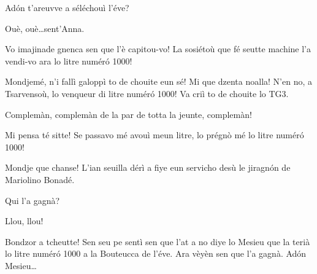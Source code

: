 \begin{drama}
\Prosperospeaks {} Ad\'on t'areuvve a séléchouì l'éve?

\Francoisspeaks Ouè, ouè\ldots sent'Anna.




\Valletspeaks Vo imajinade gnenca sen que l’è capitou-vo! La sosiétoù que fé seutte machine l’a vendi-vo ara lo litre numér\'o 1000!


\Seunteuccospeaks Mondjemé, n’i fallì galoppì to de chouite eun sé! Mi que dzenta noalla! N’en no, a Tsarvensoù, lo venqueur di litre numér\'o 1000!  Va criì to de chouite lo TG3.

\Seunteuccospeaks{} Complemàn, complemàn de la par de totta la jeunte, complemàn!


\Naimaspeaks Mi pensa té sitte! Se passavo mé avouì meun litre, lo prégnò mé lo litre numér\'o 1000! \arrabbiato


\Valletspeaks{} Mondje que chanse! L'ian seuilla dérì  a fiye eun servicho desù le jiragn\'on de Mariolino Bonadé.

\Journalistespeaks {} Qui l'a gagnà?

\Seunteuccospeaks{} Llou, llou!


\Journalistespeaks Bondzor a tcheutte! Sen seu pe sentì sen que l'at a no diye lo Mesieu que la terià lo litre num\'er\'o 1000 a la Bouteucca de l'éve. Ara vèyèn sen que l'a gagnà.  Ad\'on Mesieu\ldots


\end{drama}
